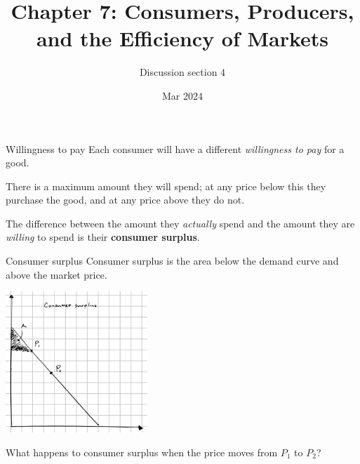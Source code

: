 \documentclass[aspectratio=169]{beamer}
\title{Chapter 7: Consumers, Producers, and the Efficiency of Markets}
\author{Discussion section 4}
\date{Mar 2024}
\begin{document}
\begin{frame}
    \titlepage 
\end{frame}




\begin{frame}{Willingness to pay}
    Each consumer will have a different \textit{willingness to pay} for a good.
    
    \vspace{2mm}

    There is a maximum amount they will spend; at any price below this they purchase the good, and at any price above they do not.

    \vspace{2mm}

    The difference between the amount they \textit{actually} spend and the amount they are \textit{willing} to spend is their \textbf{consumer surplus}.

\end{frame}

\begin{frame}{Consumer surplus}
    Consumer surplus is the area below the demand curve and above the market price.

    \centering
    \includegraphics[width = 0.4\textwidth,keepaspectratio]{surplus1.png}

    What happens to consumer surplus when the price moves from $P_1$ to $P_2$?
\end{frame}
\end{document}
